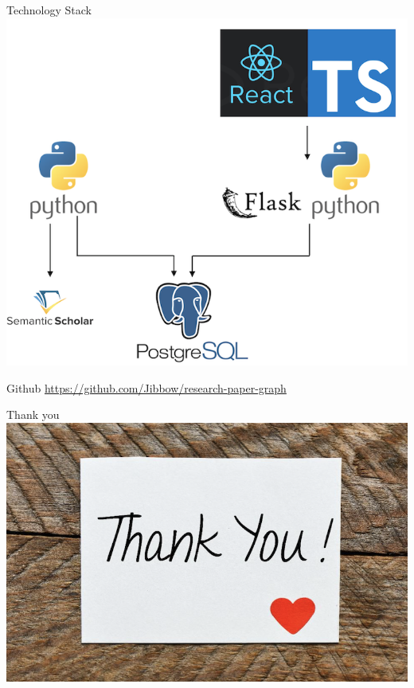 \documentclass{beamer}
\begin{document}
\begin{frame}{Technology Stack}
    \includegraphics{img_04.png}
\end{frame}

\begin{frame}{Github}
    \url{https://github.com/Jibbow/research-paper-graph}
\end{frame}

\begin{frame}{Thank you}
    \includegraphics{img_05.png}
\end{frame}
\end{document}
